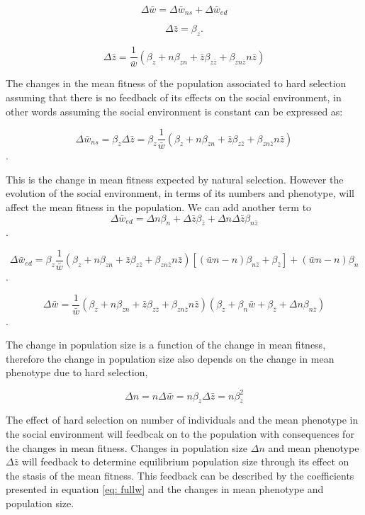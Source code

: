 \documentclass{article}
\begin{document}
 $$ \Delta \bar{w} = \Delta \bar{w}_{ns} + \Delta \bar{w}_{ed}$$ 
 
 
 $$ \Delta \bar{z} = \beta_{z}. $$ 
 
  $$ \Delta \bar{z} = \frac{1}{\bar{w}} (\beta_{z} + n  \beta_{zn} + \bar{z} \beta_{z\bar{z}} +\beta_{zn\bar{z}} n\bar{z})$$
 
  The changes in the mean fitness of the population associated to hard selection assuming that there is no feedback of its effects on the social environment, in other words assuming the social environment is constant can be expressed as:
 
$$ \Delta \bar{w}_{ns} = \beta_{z} \Delta \bar{z} =  \beta_{z} \frac{1}{\bar{w}} (\beta_{z} + n  \beta_{zn} + \bar{z} \beta_{z\bar{z}} +\beta_{zn\bar{z}} n\bar{z})$$.
 
 This is the change in mean fitness expected by natural selection. However the evolution of the social environment, in terms of its numbers and phenotype, will affect the mean fitness in the population. We can add another term to 
 $$ \Delta \bar{w}_{ed} =   \Delta n\beta_{n} + \Delta \bar{z} \beta_{\bar{z}} + \Delta n \Delta \bar{z} \beta_{n\bar{z}}$$.
 
 $$ \Delta \bar{w}_{ed} =    \beta_{z} \frac{1}{\bar{w}} (\beta_{z} + n  \beta_{zn} + \bar{z} \beta_{z\bar{z}} +\beta_{zn\bar{z}} n\bar{z})[(\bar{w}n-n)\beta_{n\bar{z}}+  \beta_{\bar{z}}] + (\bar{w}n-n) \beta_{n} $$.
 
 $$ \Delta \bar{w} =   \frac{1}{\bar{w}} (\beta_{z} + n  \beta_{zn} + \bar{z} \beta_{z\bar{z}} +\beta_{zn\bar{z}} n\bar{z})(\beta_{z} +  \beta_{n}\bar{w} + \beta_{\bar{z}} + \Delta n \beta_{n\bar{z}})$$.
 
 
 The change in population size is a function of the change in mean fitness, therefore the change in population size also depends on the change in mean phenotype due to hard selection,
 	
 $$	\Delta n = n\Delta \bar{w} = n\beta_{z}\Delta \bar{z} = n\beta_{z}^2 $$
 
The effect of hard selection on number of individuals and the mean phenotype in the social environment will feedbcak on to the population with consequences for the changes in mean fitness. Changes in population size $\Delta n$ and mean phenotype $\Delta \bar{z}$ will feedback to determine equilibrium population size through its effect on the stasis of the mean fitness. This feedback can be described by the coefficients presented in equation \ref{eq: fullw} and the changes in mean phenotype and population size.
 
\end{document}
